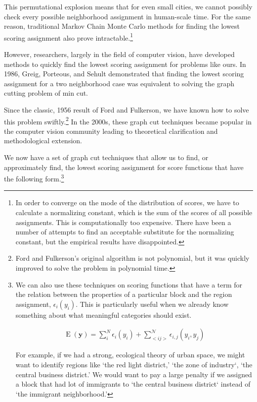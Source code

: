 This permutational explosion means that for even small cities, we
cannot possibly check every possible neighborhood assignment in
human-scale time. For the same reason, traditional Markov Chain Monte
Carlo methods for finding the lowest scoring assignment also prove
intractable.\footnote{In order to converge on the mode of the
  distribution of scores, we have to calculate a normalizing constant,
  which is the sum of the scores of all possible assignments. This is
  computationally too expensive. There have been a number of attempts
  to find an acceptable substitute for the normalizing constant, but
  the empirical results have disappointed.\citep{li_mrf_2009}}

However, researchers, largely in the field of computer vision, have
developed methods to quickly find the lowest scoring assignment for
problems like ours. In 1986, Greig, Porteous, and Sehult demonstrated
that finding the lowest scoring assignment for a two neighborhood case
was equivalent to solving the graph cutting problem of min
cut.\citep{greig_exact_1989}

 Since the classic, 1956 result of Ford and Fulkerson, we have known
 how to solve this problem swiftly.\footnote{Ford and Fulkerson's
   original algorithm is not polynomial, but it was quickly improved
   to solve the problem in polynomial time.\citep{ford_maximal_1956}}
 In the 2000s, these graph cut techniques became popular in the
 computer vision community leading to theoretical
 clarification and methodological extension.\citep{kolmogorov_what_2004}

We now have a set of graph cut techniques that allow us to find, or
approximately find, the lowest scoring assignment for score functions
that have the following form.\footnote{We can also use these
  techniques on scoring functions that have a term for the relation
  between the properties of a particular block and the region
  assignment, $\epsilon_i(y_i)$. This is particularly useful when we
  already know something about what meaningful categories should exist.

  \begin{align}
    \operatorname{E}(\mathbf{y}) = \sum_i^N\epsilon_i(y_i) + \sum_{<i j>}^{\mathcal{N}}\epsilon_{i,j}(y_i,y_j)
  \end{align}

  For example, if we had a strong, ecological theory of urban space,
  we might want to identify regions like `the red light district,'
  `the zone of industry`, `the central business district.' We would
  want to pay a large penalty if we assigned a block that had lot of
  immigrants to `the central business district` instead of `the
  immigrant neighborhood.'
}

